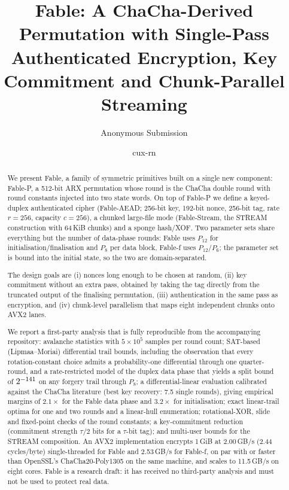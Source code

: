 \documentclass{iacrtrans}
\title[Fable]{Fable: A ChaCha-Derived Permutation with Single-Pass Authenticated Encryption, Key Commitment and Chunk-Parallel Streaming}
\author{Anonymous Submission}
\institute{--- \\ \email{---}}
\author{cux-rn}
\institute{Independent researcher \\ \email{cux_rn@outlook.com}}
\newcommand{\Fable}{\textsf{Fable}\xspace}
\newcommand{\FableP}{\textsf{Fable-P}\xspace}
\newcommand{\FableF}{\textsf{Fable-f}\xspace}
\newcommand{\FableAEAD}{\textsf{Fable-AEAD}\xspace}
\newcommand{\FableStream}{\textsf{Fable-Stream}\xspace}
\newcommand{\ChaCha}{\textsf{ChaCha}\xspace}
\newcommand{\PP}[1]{P_{#1}}
\newcommand{\WrateTwo}{42}   %
\newcommand{\WuncTwo}{33}    %
\newcommand{\BoundEight}{\the\numexpr\WrateTwo+3*\WuncTwo\relax}   %
\begin{document}
\maketitle


\begin{abstract}
We present \Fable, a family of symmetric primitives built on a single new component: \FableP, a 512-bit ARX permutation whose round is the \ChaCha double round with round constants injected into two state words. On top of \FableP we define a keyed-duplex authenticated cipher (\FableAEAD; 256-bit key, 192-bit nonce, 256-bit tag, rate $r=256$, capacity $c=256$), a chunked large-file mode (\FableStream, the STREAM construction with 64\,KiB chunks) and a sponge hash/XOF. Two parameter sets share everything but the number of data-phase rounds: \Fable uses $\PP{12}$ for initialisation/finalisation and $\PP{8}$ per data block, \FableF uses $\PP{12}/\PP{6}$; the parameter set is bound into the initial state, so the two are domain-separated.

The design goals are (i) nonces long enough to be chosen at random, (ii) key commitment without an extra pass, obtained by taking the tag directly from the truncated output of the finalising permutation, (iii) authentication in the same pass as encryption, and (iv) chunk-level parallelism that maps eight independent chunks onto AVX2 lanes.

We report a first-party analysis that is fully reproducible from the accompanying repository: avalanche statistics with $5\times10^5$ samples per round count; SAT-based (Lipmaa--Moriai) differential trail bounds, including the observation that every rotation-constant choice admits a probability-one differential through one quarter-round, and a rate-restricted model of the duplex data phase that yields a split bound of $2^{-\BoundEight}$ on any forgery trail through $\PP{8}$; a differential-linear evaluation calibrated against the \ChaCha literature (best key recovery: 7.5 single rounds), giving empirical margins of $2.1\times$ for the \Fable data phase and $3.2\times$ for initialisation; exact linear-trail optima for one and two rounds and a linear-hull enumeration; rotational-XOR, slide and fixed-point checks of the round constants; a key-commitment reduction (commitment strength $\tau/2$ bits for a $\tau$-bit tag); and multi-user bounds for the STREAM composition. An AVX2 implementation encrypts 1\,GiB at 2.00\,GB/s (2.44 cycles/byte) single-threaded for \Fable and 2.53\,GB/s for \FableF, on par with or faster than OpenSSL's ChaCha20-Poly1305 on the same machine, and scales to 11.5\,GB/s on eight cores. \Fable is a research draft: it has received no third-party analysis and must not be used to protect real data.
\end{abstract}
\end{document}
